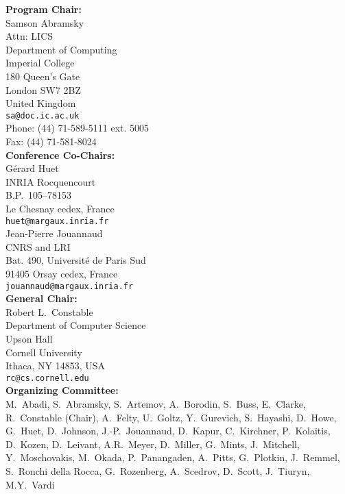 \begin{minipage}[t]{2.00in}%
\parskip 4pt

{\bf Program Chair:} \\[1mm]
Samson Abramsky\\
Attn: LICS \\
Department of Computing\\
Imperial College\\ %
180 Queen's Gate\\
London SW7 2BZ\\
United Kingdom\\
{\tt sa@doc.ic.ac.uk}\\
Phone: (44) 71-589-5111 ext. 5005\\
Fax: (44) 71-581-8024 \\

{\bf Conference Co-Chairs:} \\[1mm]
G\'{e}rard Huet\\
INRIA Rocquencourt\\
B.P.~105--78153\\
Le Chesnay {\sc cedex}, France\\
{\tt huet@margaux.inria.fr} \\[2mm]
Jean-Pierre Jouannaud\\
CNRS and LRI\\
Bat. 490, Universit\'{e} de Paris Sud\\
91405 Orsay {\sc cedex}, France\\
{\tt jouannaud@margaux.inria.fr} \\

{\bf General Chair:}\\[1mm]
Robert L.\ Constable \\
Department of Computer Science\\
Upson Hall \\
Cornell University \\
Ithaca, NY 14853, USA\\
{\tt rc@cs.cornell.edu}\\

{\bf Organizing Committee:}\\[1mm]
M.~Abadi, S.~Abramsky, S.~Artemov, A.~Borodin,
S.~Buss, E.~Clarke, R.~Constable (Chair), A.~Felty,
U.~Goltz, Y.~Gurevich, S.~Hayashi, D.~Howe, G.~Huet, D.~Johnson,
J.-P.~Jouannaud, D.~Kapur, C.~Kirchner, P.~Kolaitis, D.~Kozen,
D.~Leivant, A.R.~Meyer, D.~Miller, G.~Mints, J.~Mitchell, 
Y.~Moschovakis, M.~Okada, P.~Panangaden, A.~Pitts,
G.~Plotkin, J.~Remmel, S.~Ronchi della Rocca, G.~Rozenberg, 
A.~Scedrov, D.~Scott, J.~Tiuryn, M.Y.~Vardi
\end{minipage}
